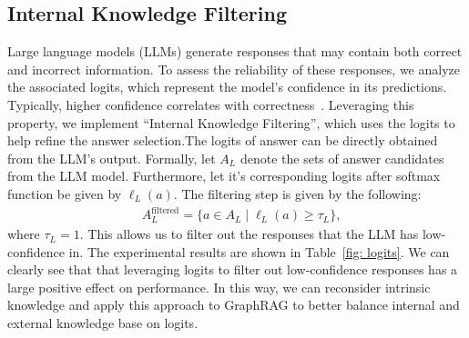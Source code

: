 \documentclass[11pt]{article}
\begin{document}
\subsection{Internal Knowledge Filtering}  \label{sec:llm_logits}
Large language models (LLMs) generate responses that may contain both correct and incorrect information. To assess the reliability of these responses, we analyze the associated logits, which represent the model's confidence in its predictions. Typically, higher confidence correlates with correctness~\cite{ma2025estimating,virk2024enhancing}. Leveraging this property, we implement ``Internal Knowledge Filtering'', which uses the logits to help refine the answer selection.The logits of answer can be directly obtained from the LLM's output.
Formally, let \(A_L\) denote the sets of answer candidates from  the LLM model. Furthermore, let it's corresponding logits after softmax function be given by \(\ell_L(a)\). The filtering step is given by the following:
\begin{align} 
    &A_L^{\text{filtered}} = \{ a \in A_L \mid \ell_L(a) \geq \tau_L \},
\end{align}
where \(\tau_L=1\).  This allows us to filter out the responses that the LLM has low-confidence in. 
The experimental results are shown in Table~\ref{fig: logits}. We can clearly see that that leveraging logits to filter out low-confidence responses has a large positive effect on performance. In this way, we can reconsider intrinsic knowledge and apply this approach to GraphRAG to better balance internal and external knowledge base on logits.

\begin{table}[h]
    \centering
\caption{Impact of logits on LLM performance}   \label{fig: logits}
\end{table}
\end{document}
